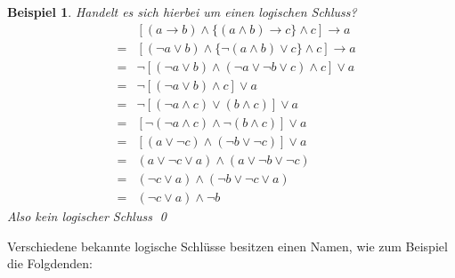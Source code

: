 \documentclass{report}
\newtheorem{myexample}{Beispiel}
\begin{document}
\begin{myexample}Handelt es sich hierbei um einen logischen Schluss?\begin{eqnarray}& &[(a \to b) \land \{(a \land b) \to c\} \land c] \to a \nonumber \\
&=&[(\lnot a \lor b) \land \{\lnot (a \land b) \lor c\} \land c] \to a \nonumber \\
&=&\lnot [(\lnot a \lor b) \land (\lnot a \lor \lnot b \lor c) \land c] \lor a \nonumber \\
&=&\lnot [(\lnot a \lor b) \land c] \lor a \nonumber \\
&=&\lnot [(\lnot a \land c) \lor (b \land c)] \lor a\nonumber \\
&=&[\lnot (\lnot a \land c) \land \lnot (b \land c)] \lor a \nonumber \\
&=&[(a \lor \lnot c) \land (\lnot b \lor \lnot c)] \lor a \nonumber \\
&=&(a \lor \lnot c \lor a) \land (a \lor \lnot b \lor \lnot c) \nonumber \\
&=&(\lnot c \lor a) \land (\lnot b \lor \lnot c \lor a) \nonumber \\
&=&(\lnot c \lor a) \land \lnot b\end{eqnarray}
Also kein logischer Schluss \qed\end{myexample}
Verschiedene bekannte logische Schlüsse besitzen einen Namen, wie zum Beispiel die Folgdenden:
\end{document}

